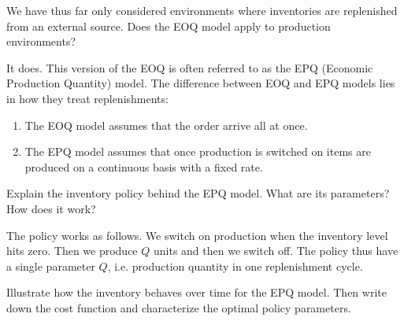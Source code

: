 \begin{question}
We have thus far only considered environments where inventories are replenished from an external source. Does the EOQ model apply to production environments?
\end{question}

\begin{solution}
It does. This version of the EOQ is often referred to as the EPQ (Economic Production Quantity) model. The difference between EOQ and EPQ models lies in how they treat replenishments:
\begin{enumerate}
\item The EOQ model assumes that the order arrive all at once.
\item The EPQ model assumes that once production is switched on items are produced on a continuous basis with a fixed rate.
\end{enumerate}
\end{solution}

\begin{question}
Explain the inventory policy behind the EPQ model. What are its parameters? How does it work?
\end{question}

\begin{solution}
The policy works as follows. We switch on production when the inventory level hits zero. Then we produce $Q$ units and then we switch off. The policy thus have a single parameter $Q$, i.e. production quantity in one replenishment cycle. 
\end{solution}

\begin{question}
Illustrate how the inventory behaves over time for the EPQ model. Then write down the cost function and characterize the optimal policy parameters.
\end{question}

